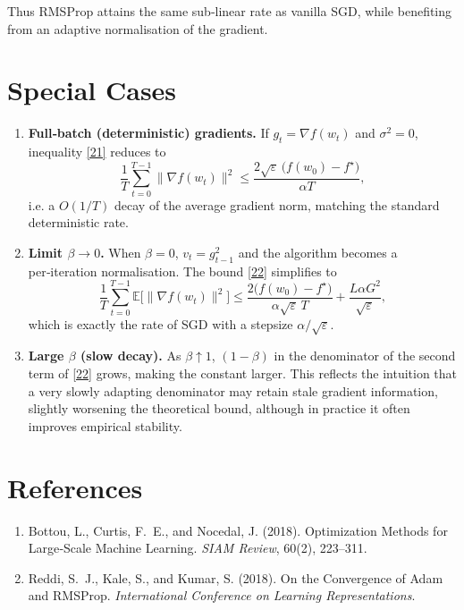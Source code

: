 \documentclass{article}
\newcommand{\E}{\mathbb{E}}
\begin{document}
Thus RMSProp attains the same sub‑linear rate as vanilla SGD, while
benefiting from an adaptive normalisation of the gradient.

\section*{Special Cases}
\begin{enumerate}
\item \textbf{Full‐batch (deterministic) gradients.}
If $g_{t}=\nabla f(w_{t})$ and $\sigma^{2}=0$, inequality \eqref{21}
reduces to
\[
\frac{1}{T}\sum_{t=0}^{T-1}\|\nabla f(w_{t})\|^{2}
\le
\frac{2\sqrt{\varepsilon}\,\bigl(f(w_{0})-f^{\star}\bigr)}{\alpha T},
\]
i.e. a $O(1/T)$ decay of the average gradient norm, matching the
standard deterministic rate.

\item \textbf{Limit $\beta\to 0$.}
When $\beta=0$, $v_{t}=g_{t-1}^{2}$ and the algorithm becomes a
per‑iteration normalisation.  The bound \eqref{22} simplifies to
\[
\frac{1}{T}\sum_{t=0}^{T-1}
\E\!\bigl[\|\nabla f(w_{t})\|^{2}\bigr]
\le
\frac{2\bigl(f(w_{0})-f^{\star}\bigr)}{\alpha\sqrt{\varepsilon}\,T}
+ \frac{L\alpha G^{2}}{\sqrt{\varepsilon}},
\]
which is exactly the rate of SGD with a stepsize $\alpha/\sqrt{\varepsilon}$.

\item \textbf{Large $\beta$ (slow decay).}
As $\beta\!\uparrow\!1$, $(1-\beta)$ in the denominator of the second
term of \eqref{22} grows, making the constant larger.  This reflects the
intuition that a very slowly adapting denominator may retain stale
gradient information, slightly worsening the theoretical bound,
although in practice it often improves empirical stability.
\end{enumerate}

\newpage
\section*{References}
\begin{enumerate}
\item Bottou, L., Curtis, F.~E., and Nocedal, J. (2018). Optimization
Methods for Large‑Scale Machine Learning. \emph{SIAM Review}, 60(2),
223–311.
\item Reddi, S.~J., Kale, S., and Kumar, S. (2018). On the Convergence of
Adam and RMSProp. \emph{International Conference on Learning
Representations}.
\end{enumerate}
\end{document}
